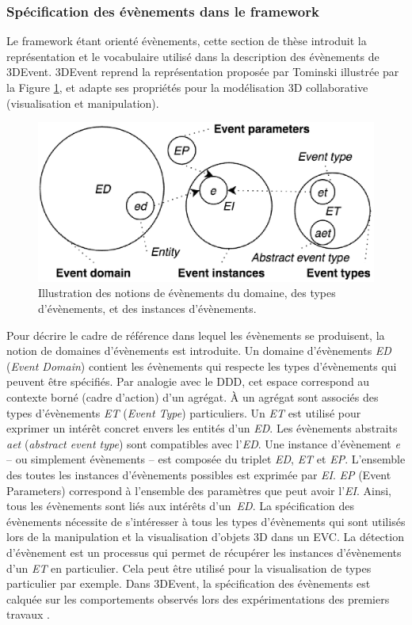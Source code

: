 \subsubsection{Spécification des évènements dans le framework}
Le framework étant orienté évènements, cette section de thèse introduit la représentation et 
le vocabulaire utilisé dans la description des évènements de 3DEvent. 3DEvent 
reprend la représentation proposée par Tominski \cite{Doktor-ingenieur2006} 
illustrée par la Figure \ref{fig:representation_event}, et adapte ses propriétés pour 
la modélisation 3D collaborative (visualisation et manipulation). 

\begin{figure}[ht]
	\centering
	\includegraphics[width=0.7\columnwidth]{eps/event4.eps}
	\caption{Illustration des notions de évènements du domaine, des types 
		d'évènements, et des instances d'évènements.}
	\label{fig:representation_event}
\end{figure} 

Pour décrire le cadre de référence dans lequel les évènements se produisent, la 
notion de domaines d'évènements est introduite. Un domaine d'évènements 
\textit{ED} (\textit{Event Domain}) contient les évènements qui respecte les types 
d'évènements qui peuvent être spécifiés. Par analogie avec le \gls{DDD}, cet 
espace correspond au contexte borné (cadre d'action) d'un agrégat. À un agrégat 
sont associés des types d'évènements \textit{ET} (\textit{Event Type}) particuliers. 
Un \textit{ET} est utilisé pour exprimer un intérêt concret envers les entités d'un 
\textit{ED}. 
Les évènements abstraits \textit{aet} (\textit{abstract event type}) sont 
compatibles avec l'\textit{ED}. 
Une instance d'évènement \textit{e} -- ou simplement 
évènements -- est composée du triplet \textit{ED}, \textit{ET} et \textit{EP}. 
L'ensemble des toutes les instances d'évènements possibles est exprimée par 
\textit{EI}. \textit{EP} (Event Parameters) correspond à l'ensemble des paramètres 
que peut avoir l'\textit{EI}. Ainsi, tous les évènements sont liés aux intérêts 
d'un~\textit{ED}. La spécification des évènements nécessite de 
s'intéresser à tous les types d'évènements qui sont utilisés lors de la manipulation 
et la visualisation d'objets 3D dans un \gls{EVC}. La détection d'évènement est un 
processus qui permet de récupérer les instances d'évènements d'un \textit{ET} en 
particulier. Cela peut être utilisé pour la visualisation de types particulier par 
exemple. Dans 3DEvent, la spécification des évènements est calquée sur les 
comportements observés lors des expérimentations des premiers travaux 
\cite{Desprat2015a, Desprat2015b}. 

